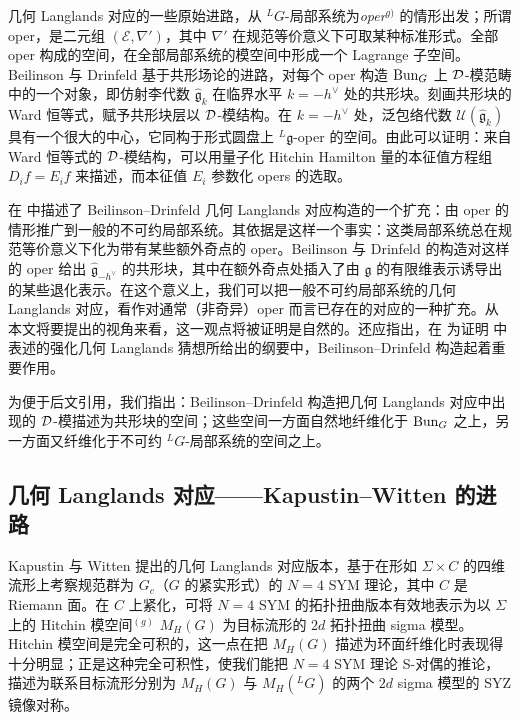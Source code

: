 几何 Langlands 对应的一些原始进路，从 ${}^{L}G$-局部系统为\emph{oper}$^{g)}$ 的情形出发；所谓 oper，是二元组 $(\mathcal{E},\nabla')$，其中 $\nabla'$ 在规范等价意义下可取某种标准形式。全部 oper 构成的空间，在全部局部系统的模空间中形成一个 Lagrange 子空间。Beilinson 与 Drinfeld 基于共形场论的进路，对每个 oper 构造 $\operatorname{Bun}_G$ 上 $\mathcal{D}$-模范畴中的一个对象，即仿射李代数 $\hat{\mathfrak g}_k$ 在临界水平 $k=-h^\vee$ 处的共形块。刻画共形块的 Ward 恒等式，赋予共形块层以 $\mathcal{D}$-模结构。在 $k=-h^\vee$ 处，泛包络代数 $\mathcal{U}(\hat{\mathfrak g}_{k})$ 具有一个很大的中心，它同构于形式圆盘上 ${}^{L}\mathfrak{g}$-oper 的空间\cite{FF92}。由此可以证明：来自 Ward 恒等式的 $\mathcal{D}$-模结构，可以用量子化 Hitchin Hamilton 量的本征值方程组 $D_i f= E_if$ 来描述，而本征值 $E_i$ 参数化 opers 的选取\cite{Fr07}。

在 \cite[Section 9.6]{Fr07} 中描述了 Beilinson--Drinfeld 几何 Langlands 对应构造的一个扩充：由 oper 的情形推广到一般的不可约局部系统。其依据是这样一个事实：这类局部系统总在规范等价意义下化为带有某些额外奇点的 oper\cite{Ar16}。Beilinson 与 Drinfeld 的构造对这样的 oper 给出 $\hat{\mathfrak g}_{-h^{\vee}}$ 的共形块，其中在额外奇点处插入了由 $\mathfrak{g}$ 的有限维表示诱导出的某些退化表示。在这个意义上，我们可以把一般不可约局部系统的几何 Langlands 对应，看作对通常（非奇异）oper 而言已存在的对应的一种扩充。从本文将要提出的视角来看，这一观点将被证明是自然的。还应指出，在 \cite{Ga15} 为证明 \cite{AG} 中表述的强化几何 Langlands 猜想所给出的纲要中，Beilinson--Drinfeld 构造起着重要作用。

为便于后文引用，我们指出：Beilinson--Drinfeld 构造把几何 Langlands 对应中出现的 $\mathcal{D}$-模描述为共形块的空间；这些空间一方面自然地纤维化于 $\operatorname{Bun}_G$ 之上，另一方面又纤维化于不可约 ${}^{L}G$-局部系统的空间之上。

\subsection{几何 Langlands 对应——Kapustin--Witten 的进路}

Kapustin 与 Witten \cite{KW} 提出的几何 Langlands 对应版本，基于在形如 $\Sigma\times C$ 的四维流形上考察规范群为 $G_c$（$G$ 的紧实形式）的 $N=4$ SYM 理论，其中 $C$ 是 Riemann 面。在 $C$ 上紧化，可将 $N=4$ SYM 的拓扑扭曲版本有效地表示为以 $\Sigma$ 上的 Hitchin 模空间$^{(g)}$ $M_H(G)$ 为目标流形的 $2d$ 拓扑扭曲 sigma 模型。Hitchin 模空间是完全可积的，这一点在把 $M_H(G)$ 描述为环面纤维化时表现得十分明显；正是这种完全可积性，使我们能把 $N=4$ SYM 理论 S-对偶的推论，描述为联系目标流形分别为 $M_H(G)$ 与 $M_H({}^{L} G)$ 的两个 $2d$ sigma 模型的 SYZ 镜像对称。

